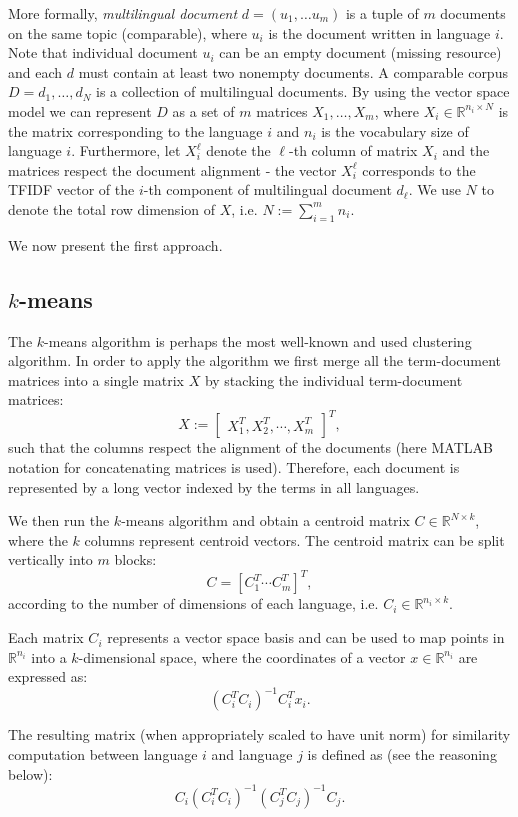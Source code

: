 \documentclass[twoside,11pt]{article}
\newcommand{\RR}{\mathbb{R}}
\begin{document}
More formally, \emph{multilingual document} $d = (u_1,\ldots u_m)$ is a tuple of $m$ documents on the same topic (comparable), where $u_i$ is the document written in language $i$. Note that individual document $u_i$ can be an empty document (missing resource) and each $d$ must contain at least two nonempty documents. A comparable corpus $D = {d_1, \ldots, d_N}$ is a collection of multilingual documents. By using the vector space model we can represent $D$ as a set of $m$ matrices $X_1,\ldots,X_m$, where $X_i \in \RR^{n_i \times N}$ is the matrix corresponding to the language $i$ and $n_i$ is the vocabulary size of language $i$. Furthermore, let $X_i^{\ell}$ denote the $\ell$-th column of matrix $X_i$ and the matrices respect the document alignment - the vector $X_i^\ell$ corresponds to the TFIDF vector of the $i$-th component of multilingual document $d_\ell$. We use $N$ to denote the total row dimension of $X$, i.e. $N:= \sum_{i=1}^m n_i$.

We now present the first approach.

\subsection{$k$-means}

The $k$-means algorithm is perhaps the most well-known and used clustering algorithm. In order to apply the algorithm we first merge all the term-document matrices into a single matrix $X$ by stacking the individual term-document matrices:
$$X := \begin{bmatrix}X_1^T ,X_2^T, \cdots, X_m^T \end{bmatrix}^T,$$
such that the columns respect the alignment of the documents (here MATLAB notation for concatenating matrices is used). Therefore, each document  is represented by a long vector indexed by the terms in all languages.

We then run the $k$-means algorithm \cite{kmeans} and obtain a centroid matrix $C \in \RR^{N \times k}$, where the $k$ columns represent centroid vectors. The centroid matrix can be split vertically into $m$ blocks: $$C = [C_1^T \cdots C_m^T]^T,$$ according to the number of dimensions of each language, i.e. $C_i \in \RR^{n_i \times k}$.

Each matrix $C_i$ represents a vector space basis and can be used to map points in $\RR^{n_i}$ into a $k$-dimensional space, where the coordinates of a vector $x \in \RR^{n_i}$ are expressed as: $$(C_i^T C_i)^{-1} C_i^T x_i.$$

The resulting matrix (when appropriately scaled to have unit norm) for similarity computation between language $i$ and language $j$ is defined as (see the reasoning below):
$$C_i(C_i^T C_i)^{-1} (C_j^T C_j)^{-1} C_j.$$
\end{document}

